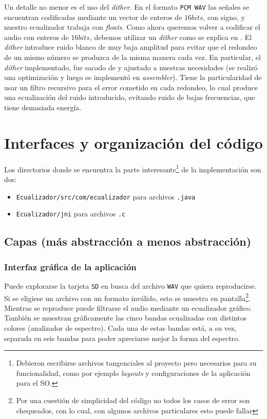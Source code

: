 \documentclass[%
    compressed,
    titlepage,
    narroweqnarray,
    inline,
    twoside,
    ]{ieee}
\begin{document}
Un detalle no menor es el uso del \textit{dither}.
En el formato \texttt{PCM WAV} las se\~nales se encuentran codificadas mediante un vector de enteros de
$16 bits$, con signo, y nuestro ecualizador trabaja con \textit{floats}. Como ahora queremos volver a
codificar el audio con enteros de $16 bits$, debemos utilizar un \textit{dither} como se explica en
\cite[Chapter 3: ADC and DAC]{ingeniero}.
El \textit{dither} introduce ruido blanco de muy baja amplitud para evitar que el redondeo de un mismo n\'umero se produzca
de la misma manera cada vez. En particular, el \textit{dither} implementado, fue sacado de \cite{dither} y ajustado a nuestras necesidades
(se realiz\'o una optimizaci\'on y luego se implement\'o en \textit{assembler}).
Tiene la particularidad de usar un filtro recursivo para el error cometido en cada redondeo, lo cual produce una ecualizaci\'on
del ruido introducido, evitando ruido de bajas frecuencias, que tiene demasiada energ\'ia.

\section{Interfaces y organizaci\'on del c\'odigo}

Los directorios donde se encuentra la parte interesante\footnote{Debieron escribirse archivos tangenciales al proyecto pero
necesarios para su funcionalidad, como por ejemplo \textit{layouts} y configuraciones de la aplicaci\'on para el SO.}
de la implementaci\'on son dos:
\begin{itemize}
    \item \texttt{Ecualizador/src/com/ecualizador} para archivos \texttt{.java}
    \item \texttt{Ecualizador/jni} para archivos \texttt{.c}
\end{itemize}

\subsection{Capas (m\'as abstracci\'on a menos abstracci\'on)}

\subsubsection{Interfaz gr\'afica de la aplicaci\'on}
Puede explorarse la tarjeta \texttt{SD} en busca del archivo \texttt{WAV} que quiera reproducirse.
Si se eligiese un archivo con un formato inv\'alido, esto se muestra en pantalla\footnote{Por una cuesti\'on de simplicidad del c\'odigo
no todos los casos de error son chequeados, con lo cual, con algunos archivos particulares esto puede fallar}.
Mientras se reproduce puede filtrarse el audio mediante un ecualizador gr\'afico.
Tambi\'en se muestran gr\'aficamente las cinco bandas ecualizadas con distintos colores (analizador de espectro). Cada una de
estas bandas est\'a, a su vez, separada en seis bandas para poder apreciarse mejor la forma del espectro.
\end{document}
